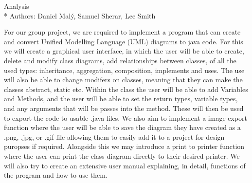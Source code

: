 \documentclass[a4paper]{article}
\begin{document}
\begin{center}
\huge{Analysis}\\*
\small{Authors: Daniel Mal\'{y}, Samuel Sherar, Lee Smith}
\end{center}

For our group project, we are required to implement a program that can create and convert Unified Modelling Language (UML) diagrams to java code. For this we will create a graphical user interface, in which the user will be able to create, delete and modify class diagrams, add relationships between classes, of all the used types: inheritance, aggregation, composition, implements and uses. The use will also be able to change modifers on classes, meaning that they can make the classes abstract, static etc. Within the class the user will be able to add Variables and Methods, and the user will be able to set the return types, variable types, and any arguments that will be passes into the method. These will then be used to export the code to usable .java files. We also aim to implement a image export function where the user will be able to save the diagram they have created as a .png, .jpg, or .gif file allowing them to easily add it to a project for design puropses if required. Alongside this we may introduce a print to printer function where the user can print the class diagram directly to their desired printer. We will also try to create an extensive user manual explaining, in detail, functions of the program and how to use them. 
\end{document}
